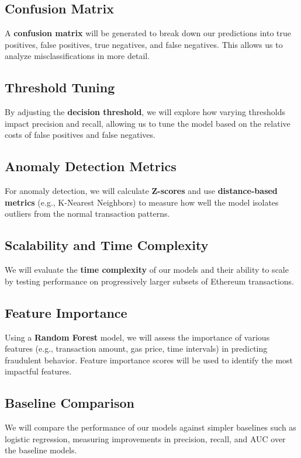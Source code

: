 \documentclass[sigconf]{acmart}
\begin{document}
\subsection{Confusion Matrix}
A \textbf{confusion matrix} will be generated to break down our predictions into true positives, false positives, true negatives, and false negatives. This allows us to analyze misclassifications in more detail.

\subsection{Threshold Tuning}
By adjusting the \textbf{decision threshold}, we will explore how varying thresholds impact precision and recall, allowing us to tune the model based on the relative costs of false positives and false negatives.

\subsection{Anomaly Detection Metrics}
For anomaly detection, we will calculate \textbf{Z-scores} and use \textbf{distance-based metrics} (e.g., K-Nearest Neighbors) to measure how well the model isolates outliers from the normal transaction patterns.

\subsection{Scalability and Time Complexity}
We will evaluate the \textbf{time complexity} of our models and their ability to scale by testing performance on progressively larger subsets of Ethereum transactions.

\subsection{Feature Importance}
Using a \textbf{Random Forest} model, we will assess the importance of various features (e.g., transaction amount, gas price, time intervals) in predicting fraudulent behavior. Feature importance scores will be used to identify the most impactful features.

\subsection{Baseline Comparison}
We will compare the performance of our models against simpler baselines such as logistic regression, measuring improvements in precision, recall, and AUC over the baseline models.
\end{document}
